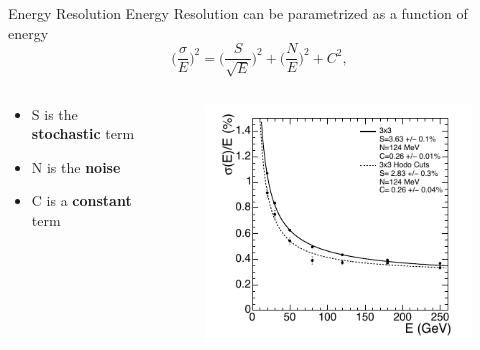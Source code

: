 \documentclass[10pt]{beamer}
\begin{document}
\begin{frame}{Energy Resolution}
    Energy Resolution can be parametrized as a function of energy
    \begin{equation}
        \biggl(\frac{\sigma}{E}\biggr)^2 = \biggl(\frac{S}{\sqrt{E}}\biggr)^2 + \biggl(\frac{N}{E}\biggr)^2 + C^2 ,
    \end{equation}
  
    \begin{columns}
        \begin{column}[l]{0.45\textwidth}
        \begin{itemize}
            \item S is the \textbf{stochastic} term
            \item N is the \textbf{noise}
            \item C is a \textbf{constant} term
        \end{itemize}
        \end{column}
        \begin{column}[l]{0.45\textwidth}
            \begin{figure}
            \includegraphics[width=\textwidth]{./img/res_energy.png}
            \end{figure}
        \end{column}
    \end{columns}
    
\end{frame}
\end{document}

